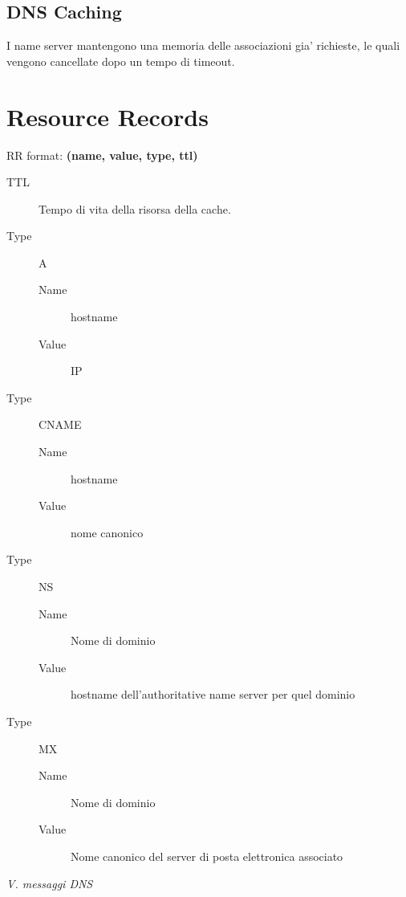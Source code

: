 \subsection{DNS Caching}
I name server mantengono una memoria delle associazioni gia' richieste, le quali vengono cancellate dopo un tempo di timeout.
\section{Resource Records}
\begin{center}
    RR format: \textbf{(name, value, type, ttl)}
\end{center}
\begin{description}
    \item[TTL] Tempo di vita della risorsa della cache.
    \item[Type] A 
    \begin{description}
        \item[Name]  hostname
        \item[Value] IP 
    \end{description}  
    \item[Type] CNAME
    \begin{description}
        \item[Name] hostname
        \item[Value] nome canonico  
    \end{description} 
    \item[Type] NS
    \begin{description}
        \item[Name] Nome di dominio
        \item[Value] hostname dell'authoritative name server per quel dominio
    \end{description} 
    \item[Type] MX
    \begin{description}
        \item[Name] Nome di dominio
        \item[Value] Nome canonico del server di posta elettronica associato
    \end{description} 
\end{description}
\textit{\small V. messaggi DNS}
